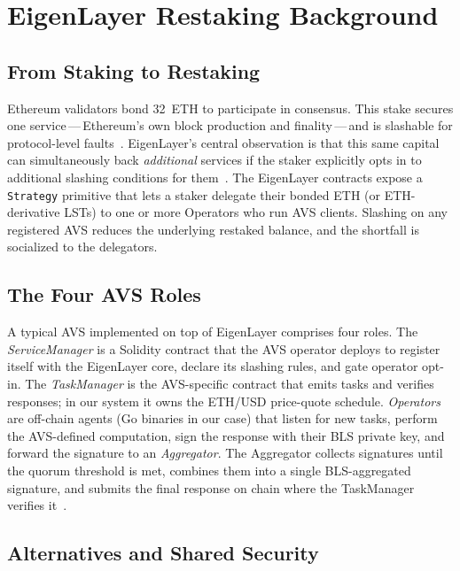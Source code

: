 \section{EigenLayer Restaking Background}
\label{sec:background}

\subsection{From Staking to Restaking}

Ethereum validators bond 32~ETH to participate in consensus.  This
stake secures one service\,---\,Ethereum's own block production and
finality\,---\,and is slashable for protocol-level
faults~\cite{buterin2014ethereum}.  EigenLayer's central observation
is that this same capital can simultaneously back \emph{additional}
services if the staker explicitly opts in to additional slashing
conditions for them~\cite{eigenlayer2023}.  The EigenLayer contracts
expose a \texttt{Strategy} primitive that lets a staker delegate
their bonded ETH (or ETH-derivative LSTs) to one or more Operators
who run AVS clients.  Slashing on any registered AVS reduces the
underlying restaked balance, and the shortfall is socialized to the
delegators.

\subsection{The Four AVS Roles}

A typical AVS implemented on top of EigenLayer comprises four roles.
The \emph{ServiceManager} is a Solidity contract that the AVS
operator deploys to register itself with the EigenLayer core, declare
its slashing rules, and gate operator opt-in.  The
\emph{TaskManager} is the AVS-specific contract that emits tasks and
verifies responses; in our system it owns the ETH/USD price-quote
schedule.  \emph{Operators} are off-chain agents (Go binaries in our
case) that listen for new tasks, perform the AVS-defined computation,
sign the response with their BLS private key, and forward the
signature to an \emph{Aggregator}.  The Aggregator collects signatures
until the quorum threshold is met, combines them into a single
BLS-aggregated signature, and submits the final response on chain
where the TaskManager verifies it~\cite{layrlabs_isavs,eigenlabs_avsbook}.

\subsection{Alternatives and Shared Security}

